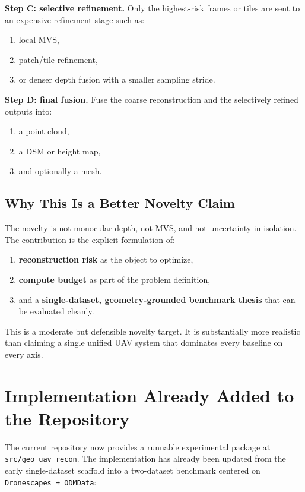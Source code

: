 \documentclass[11pt,a4paper]{article}
\begin{document}
\textbf{Step C: selective refinement.}
Only the highest-risk frames or tiles are sent to an expensive refinement stage such as:
\begin{enumerate}[leftmargin=1.5em]
  \item local MVS,
  \item patch/tile refinement,
  \item or denser depth fusion with a smaller sampling stride.
\end{enumerate}

\textbf{Step D: final fusion.}
Fuse the coarse reconstruction and the selectively refined outputs into:
\begin{enumerate}[leftmargin=1.5em]
  \item a point cloud,
  \item a DSM or height map,
  \item and optionally a mesh.
\end{enumerate}

\subsection{Why This Is a Better Novelty Claim}

The novelty is not monocular depth, not MVS, and not uncertainty in isolation. The contribution is the explicit formulation of:
\begin{enumerate}[leftmargin=1.5em]
  \item \textbf{reconstruction risk} as the object to optimize,
  \item \textbf{compute budget} as part of the problem definition,
  \item and a \textbf{single-dataset, geometry-grounded benchmark thesis} that can be evaluated cleanly.
\end{enumerate}

This is a moderate but defensible novelty target. It is substantially more realistic than claiming a single unified UAV system that dominates every baseline on every axis.

\section{Implementation Already Added to the Repository}

The current repository now provides a runnable experimental package at \texttt{src/geo\_uav\_recon}. The implementation has already been updated from the early single-dataset scaffold into a two-dataset benchmark centered on \texttt{Dronescapes + ODMData}:
\end{document}
